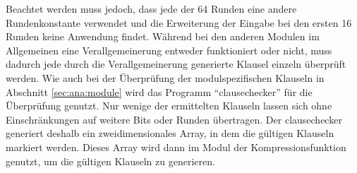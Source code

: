 Beachtet werden muss jedoch, dass jede der 64 Runden eine andere Rundenkonstante verwendet und die Erweiterung der Eingabe bei den ersten 16 Runden keine
Anwendung findet. Während bei den anderen Modulen im Allgemeinen eine Verallgemeinerung entweder funktioniert oder nicht, muss dadurch jede durch die
Verallgemeinerung generierte Klausel einzeln überprüft werden. Wie auch bei der Überprüfung der modulspezifischen Klauseln in Abschnitt \ref{sec:ana:module}
wird das Programm "`clausechecker"' für die Überprüfung genutzt. Nur wenige der ermittelten Klauseln lassen sich ohne Einschränkungen auf weitere Bits oder
Runden übertragen. Der clausechecker generiert deshalb ein zweidimensionales Array, in dem die gültigen Klauseln markiert werden. Dieses Array wird dann im
Modul der Kompressionsfunktion genutzt, um die gültigen Klauseln zu generieren.

